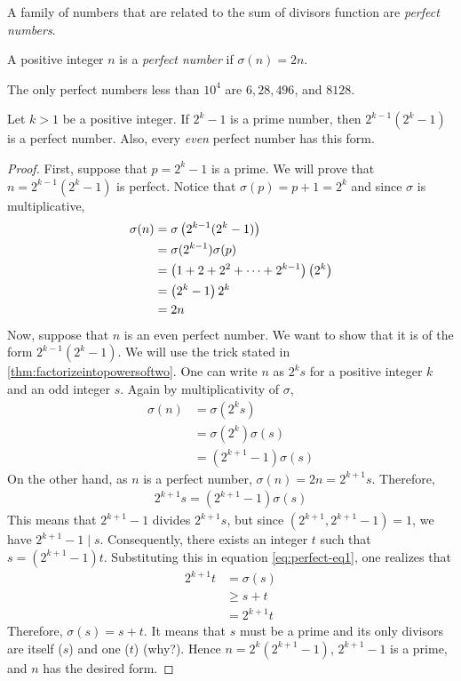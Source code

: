 A family of numbers that are related to the sum of divisors function are \textit{perfect numbers}.

\begin{definition}
	A positive integer $n$ is a \textit{perfect number} if $\sigma(n)=2n$.
\end{definition}

\begin{example}
	The only perfect numbers less than $10^4$ are $6, 28, 496$, and $8128$.
\end{example}

\begin{theorem}
	Let $k>1$ be a positive integer. If $2^k-1$ is a prime number, then $2^{k-1}(2^k-1)$ is a perfect number. Also, every \textit{even} perfect number has this form.
\end{theorem}

\begin{proof}
	First, suppose that $p=2^k-1$ is a prime. We will prove that $n=2^{k-1}(2^k-1)$ is perfect. Notice that $\sigma(p)=p+1=2^k$ and since $\sigma$ is multiplicative,
	\begin{align*}
		\sigma(n)
			&= \sigma\left(2^{k-1}(2^k-1)\right)\\
			& = \sigma(2^{k-1}) \sigma(p)\\
			&= \left(1+2+2^2+\cdots+2^{k-1}\right) \left(2^k\right)\\
			&= \left(2^k-1\right) 2^k\\
			&= 2n
	\end{align*}
	Now, suppose that $n$ is an even perfect number. We want to show that it is of the form $2^{k-1}(2^k-1)$. We will use the trick stated in \autoref{thm:factorizeintopowersoftwo}. One can write $n$ as $2^ks$ for a positive integer $k$ and an odd integer $s$. Again by multiplicativity of $\sigma$,
	\begin{align*}
		\sigma(n)
			&= \sigma(2^k s)\\
			& = \sigma(2^k)\sigma(s)\\
			& = \left(2^{k+1}-1\right) \sigma(s)
	\end{align*}
	On the other hand, as $n$ is a perfect number, $\sigma(n)=2n = 2^{k+1}s$. Therefore,
	\begin{align}
		2^{k+1}s = \left(2^{k+1}-1\right) \sigma(s)\label{eq:perfect-eq1}
	\end{align}
	This means that $2^{k+1}-1$ divides $2^{k+1}s$, but since $(2^{k+1}, 2^{k+1}-1)= 1$, we have $2^{k+1}-1\mid s$. Consequently, there exists an integer $t$ such that $s = \left(2^{k+1}-1\right) t$.  Substituting this in equation \ref{eq:perfect-eq1}, one realizes that
	\begin{align*}
		2^{k+1}t
			& = \sigma(s)\\
			& \geq s +t\\
			& = 2^{k+1}t
	\end{align*}
	Therefore, $\sigma(s)=s+t$. It means that $s$ must be a prime and its only divisors are itself ($s$) and one ($t$) (why?). Hence $n=2^k(2^{k+1}-1)$,  $2^{k+1}-1$ is a prime, and $n$ has the desired form.
\end{proof}


